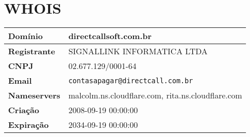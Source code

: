 
\section{WHOIS}
\begin{tabular}{|l|l|}
\hline
\textbf{Domínio} & directcallsoft.com.br \\ \hline
\textbf{Registrante} & SIGNALLINK INFORMATICA LTDA \\ \hline
\textbf{CNPJ} & 02.677.129/0001-64 \\ \hline
\textbf{Email} & \texttt{contasapagar@directcall.com.br} \\ \hline
\textbf{Nameservers} & malcolm.ns.cloudflare.com, rita.ns.cloudflare.com \\ \hline
\textbf{Criação} & 2008-09-19 00:00:00 \\ \hline
\textbf{Expiração} & 2034-09-19 00:00:00 \\ \hline
\end{tabular}
